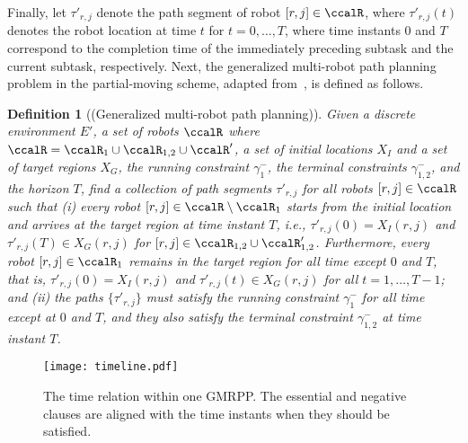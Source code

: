 \documentclass[Afour,sageh,times]{sagej}
\newtheorem{defn}[thm]{Definition}
\begin{document}
{{Finally, let $\tau'_{r,j}$ denote the path segment of robot $[r,j] \in \ccalR$, where $\tau'_{r,j}(t)$ denotes the robot location at time $t$ for $ t = 0,  \ldots, T$, where time instants 0  and $T$ correspond to the completion time of the immediately preceding subtask and the current subtask, respectively. Next, the generalized multi-robot path planning problem in the partial-moving scheme, adapted from~\cite{yu2016optimal}, is defined as follows.
 \begin{defn}[(Generalized multi-robot path planning)]\label{defn:gmmpp}
    Given a discrete environment $E'$, a set of robots $\ccalR$ where $\ccalR = \ccalR_1 \cup\ccalR_{1,2} \cup \ccalR'$, a set of initial locations $X_I$ and a set of target regions $X_G$, the running constraint $\gamma_1^-$, the terminal constraints $\gamma_{1,2}^-$, and the horizon $T$, find a collection of path segments $\tau'_{r,j}$ for all robots $[r,j]\in \ccalR$ such that {\it (i)} every robot $[r,j] \in \ccalR\setminus\ccalR_1$ starts from the initial location and arrives at the target region at time instant $T$, i.e., $ \tau'_{r,j}(0) = X_I(r,j)$ and  $ \tau'_{r,j}(T) \in X_G(r,j)$ for $[r,j] \in  \ccalR_{1,2} \cup \ccalR'_{1,2}$. Furthermore, every robot $[r,j] \in \ccalR_1$ remains in the target region for all time except $0$ and $T$, that is, $ \tau'_{r,j}(0) = X_I(r,j)$ and $\tau'_{r,j}(t) \in X_G(r,j)$ for all $t=1,\ldots, T-1$;
  and {\it (ii)} the paths $\{\tau'_{r,j}\}$ must satisfy the running constraint $\gamma^-_1$ for all time except at $0$ and $T$, and they also satisfy the terminal constraint $\gamma^-_{1,2}$ at time instant $T$.
 \end{defn}

 \begin{figure}[!t]
   \centering
   \texttt{[image: timeline.pdf]}
   \caption{The time relation within one GMRPP. The essential and negative clauses are aligned with the time instants when they should be satisfied.}
   \label{fig:timeline}
 \end{figure}

}}
\end{document}
